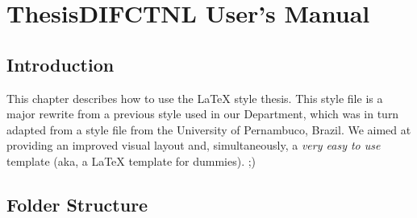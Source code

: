 % 
%  
%
\chapter*{ThesisDIFCTNL User's Manual}
\label{cha:users_manual}

\section{Introduction} %
\label{sec:introduction}

This chapter describes how to use the \LaTeX{} style thesis{}. This style file is a major rewrite from a previous style used in our Department, which was in turn adapted from a style file from the University of Pernambuco, Brazil.  We aimed at providing an improved visual layout and, simultaneously, a \emph{very easy to use} template (aka, a \LaTeX{} template for dummies). ;)

\noindent%

\section{Folder Structure} %
\label{sec:folder_structure}

